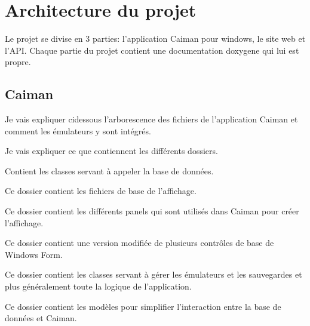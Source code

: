 \documentclass[a4paper,12pt,french]{sphinxmanual}
\begin{document}
\section{Architecture du projet}
\label{\detokenize{organique:architecture-du-projet}}
\sphinxAtStartPar
Le projet se divise en 3 parties: l’application Caiman pour windows, le site web et l’API. Chaque partie du projet contient une documentation doxygene qui lui est propre.


\subsection{Caiman}
\label{\detokenize{organique:caiman}}
\sphinxAtStartPar
Je vais expliquer ci\sphinxhyphen{}dessous l’arborescence des fichiers de l’application Caiman et comment les émulateurs y sont intégrés.

\sphinxAtStartPar
{}

\sphinxAtStartPar
Je vais expliquer ce que contiennent les différents dossiers.

\sphinxAtStartPar
{}

\sphinxAtStartPar
Contient les classes servant à appeler la base de données.

\sphinxAtStartPar
{}

\sphinxAtStartPar
Ce dossier contient les fichiers de base de l’affichage.

\sphinxAtStartPar
{}

\sphinxAtStartPar
Ce dossier contient les différents panels qui sont utilisés dans Caiman pour créer l’affichage.

\sphinxAtStartPar
{}

\sphinxAtStartPar
Ce dossier contient une version modifiée de plusieurs contrôles de base de Windows Form.

\sphinxAtStartPar
{}

\sphinxAtStartPar
Ce dossier contient les classes servant à gérer les émulateurs et les sauvegardes et plus généralement toute la logique de l’application.

\sphinxAtStartPar
{}

\sphinxAtStartPar
Ce dossier contient les modèles pour simplifier l’interaction entre la base de données et Caiman.

\sphinxAtStartPar
{}
\end{document}
